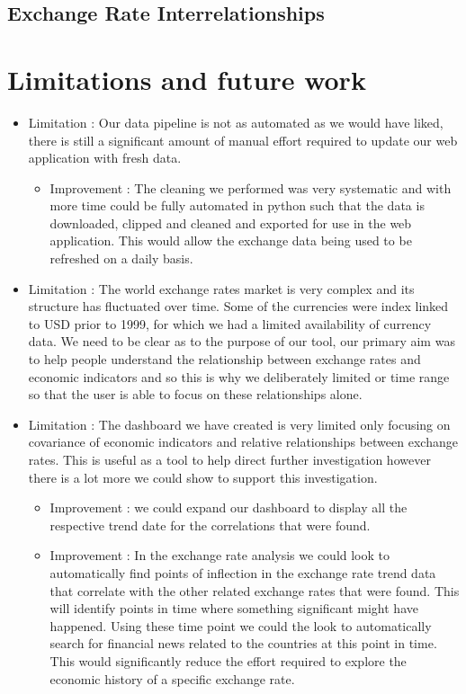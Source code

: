 \subsection{Exchange Rate Interrelationships}

\section{Limitations and future work}

\begin{itemize}
	\item Limitation : Our data pipeline is not as automated as we would have liked, there is still a significant amount of manual effort required to update our web application with fresh data.
	\begin{itemize}
		\item Improvement : The cleaning we performed was very systematic and with more time could be fully automated in python such that the data is downloaded, clipped and cleaned and exported for use in the web application.  This would allow the exchange data being used to be refreshed on a daily basis.
	\end{itemize} 
	\item Limitation : The world exchange rates market is very complex and its structure has fluctuated over time. Some of the currencies were index linked to USD prior to 1999, for which we had a limited availability of currency data.  We need to be clear as to the purpose of our tool, our primary aim was to help people understand the relationship between exchange rates and economic indicators and so this is why we deliberately limited or time range so that the user is able to focus on these relationships alone.
	\item Limitation : The dashboard we have created is very limited only focusing on covariance of economic indicators and relative relationships between exchange rates.  This is useful as a tool to help direct further investigation however there is a lot more we could show to support this investigation.
	\begin{itemize}
		\item Improvement : we could expand our dashboard to display all the respective trend date for the correlations that were found.
		\item Improvement : In the exchange rate analysis we could look to automatically find points of inflection in the exchange rate trend data that correlate with the other related exchange rates that were found.  This will identify points in time where something significant might have happened.  Using these time point we could the look to automatically search for financial news related to the countries at this point in time.  This would significantly reduce the effort required to explore the economic history of a specific exchange rate.
	\end{itemize}
	
\end{itemize}



 







